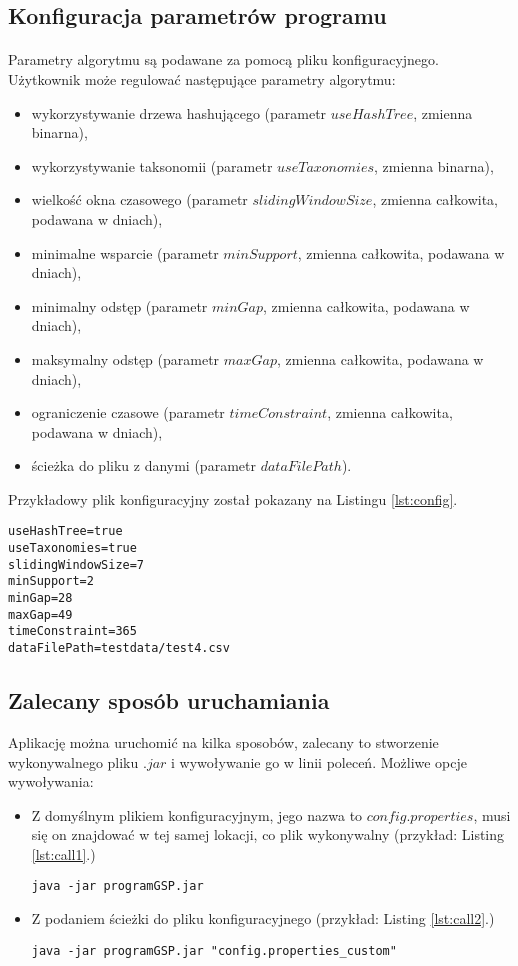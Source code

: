 \documentclass[11pt,a4paper]{article}
\begin{document}
\subsection{Konfiguracja parametrów programu}
\label{subsec:Param}
\paragraph{} Parametry algorytmu są podawane za pomocą pliku konfiguracyjnego. Użytkownik może regulować następujące parametry algorytmu:
\begin{itemize}
\item wykorzystywanie drzewa hashującego (parametr $useHashTree$, zmienna binarna),
\item wykorzystywanie taksonomii (parametr $useTaxonomies$, zmienna binarna),
\item wielkość okna czasowego (parametr $slidingWindowSize$, zmienna całkowita, podawana w dniach),
\item minimalne wsparcie (parametr $minSupport$, zmienna całkowita, podawana w dniach),
\item minimalny odstęp (parametr $minGap$, zmienna całkowita, podawana w dniach),
\item maksymalny odstęp (parametr $maxGap$, zmienna całkowita, podawana w dniach),
\item ograniczenie czasowe (parametr $timeConstraint$, zmienna całkowita, podawana w dniach),
\item ścieżka do pliku z danymi (parametr $dataFilePath$).
\end{itemize}
Przykładowy plik konfiguracyjny został pokazany na Listingu \ref{lst:config}.
\newpage
\begin{lstlisting}[caption={Przykładowy plik konfiguracyjny},label={lst:config}]
useHashTree=true
useTaxonomies=true
slidingWindowSize=7
minSupport=2
minGap=28
maxGap=49
timeConstraint=365
dataFilePath=testdata/test4.csv
\end{lstlisting}
\subsection{Zalecany sposób uruchamiania}
Aplikację można uruchomić na kilka sposobów, zalecany to stworzenie wykonywalnego pliku $.jar$ i wywoływanie go w linii poleceń. Możliwe opcje wywoływania:
\begin{itemize}
\item Z domyślnym plikiem konfiguracyjnym, jego nazwa to $config.properties$, musi się on znajdować w tej samej lokacji, co plik wykonywalny (przykład: Listing \ref{lst:call1}.)
\begin{lstlisting}[caption={Wywołanie dla domyślnego pliku konfiguracyjnego},label={lst:call1}]
java -jar programGSP.jar
\end{lstlisting}
\item Z podaniem ścieżki do pliku konfiguracyjnego (przykład: Listing \ref{lst:call2}.)
\begin{lstlisting}[caption={Wywołanie ze specyfikacją pliku konfiguracyjnego},label={lst:call2}]
java -jar programGSP.jar "config.properties_custom"
\end{lstlisting}
\end{itemize}
\end{document}
